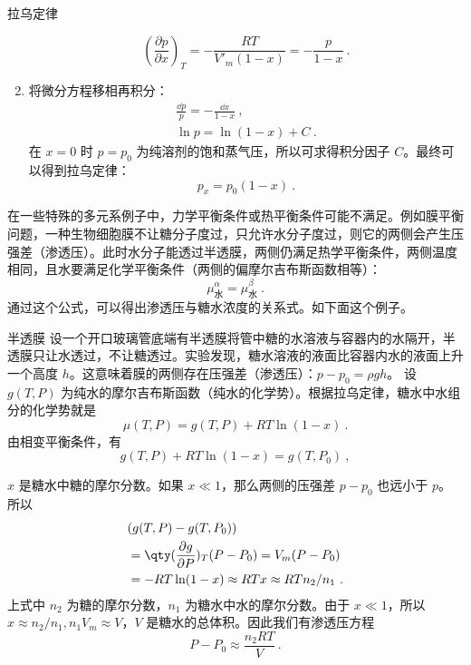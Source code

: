 \begin{example}{拉乌定律}
\begin{enumerate}
\begin{equation}
\left(\frac{\partial p}{\partial x}\right)_T=-\frac{RT}{V'_m(1-x)}=-\frac{p}{1-x}~.
\end{equation}
\item 将微分方程移相再积分：
\begin{equation}
\begin{aligned}
\frac{\dd p}{p}=-\frac{\dd x}{1-x}~,\\
\ln p=\ln(1-x)+C~.
\end{aligned}
\end{equation}
在 $x=0$ 时 $p=p_0$ 为纯溶剂的饱和蒸气压，所以可求得积分因子 $C$。最终可以得到拉乌定律：
\begin{equation}
p_x=p_0(1-x)~.
\end{equation}
\end{enumerate}
\end{example}

在一些特殊的多元系例子中，力学平衡条件或热平衡条件可能不满足。例如膜平衡问题，一种生物细胞膜不让糖分子度过，只允许水分子度过，则它的两侧会产生压强差（渗透压）。此时水分子能透过半透膜，两侧仍满足热学平衡条件，两侧温度相同，且水要满足化学平衡条件（两侧的偏摩尔吉布斯函数相等）：
\begin{equation}
\mu_\text{水}^\alpha=\mu_\text{水}^\beta~.
\end{equation}
通过这个公式，可以得出渗透压与糖水浓度的关系式。如下面这个例子。
\begin{example}{半透膜}
设一个开口玻璃管底端有半透膜将管中糖的水溶液与容器内的水隔开，半透膜只让水透过，不让糖透过。实验发现，糖水溶液的液面比容器内水的液面上升一个高度 $h$。这意味着膜的两侧存在压强差（渗透压）：$p-p_0=\rho gh$。
设 $g(T,P)$ 为纯水的摩尔吉布斯函数（纯水的化学势）。根据拉乌定律，糖水中水组分的化学势就是
\begin{equation}
\mu(T,P)=g(T,P)+RT\ln (1-x)~.
\end{equation}
由相变平衡条件，有
\begin{equation}
g(T,P)+RT\ln (1-x)=g(T,P_0)~,
\end{equation}

$x$ 是糖水中糖的摩尔分数。如果 $x\ll 1$，那么两侧的压强差 $p-p_0$ 也远小于 $p$。所以
\begin{equation}
\begin{aligned}
&(g(T,P)-g(T,P_0))\\
&=\qty(\frac{\partial g}{\partial P})_{T} (P-P_0)=V_m(P-P_0)\\
&=-RT\ln(1-x)\approx RT x\approx RT n_2/n_1~.
\end{aligned}
\end{equation}
上式中 $n_2$ 为糖的摩尔分数，$n_1$ 为糖水中水的摩尔分数。由于 $x\ll 1$，所以 $x\approx n_2/n_1, n_1V_m\approx V$，$V$ 是糖水的总体积。因此我们有渗透压方程
\begin{equation}
P-P_0\approx\frac{n_2RT}{V}~.
\end{equation}


\end{example}

